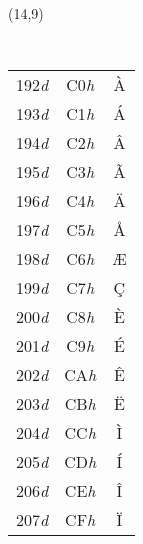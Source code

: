 \documentclass[a4paper, landscape, 10pt]{article} %
\begin{document}
\begin{textblock}{3}(14,9)
{\tt 
  \begin{tabular*}{\textwidth}{|ccc}
    \hline
    192\textit{d} & C0\textit{h} & \`{A} \\
    193\textit{d} & C1\textit{h} & \'{A} \\
    194\textit{d} & C2\textit{h} & \^{A} \\
    195\textit{d} & C3\textit{h} & \~{A} \\
    196\textit{d} & C4\textit{h} & \"{A} \\
    197\textit{d} & C5\textit{h} & \AA \\
    198\textit{d} & C6\textit{h} & \AE \\
    199\textit{d} & C7\textit{h} & \c{C} \\
    200\textit{d} & C8\textit{h} & \`{E} \\
    201\textit{d} & C9\textit{h} & \'{E} \\
    202\textit{d} & CA\textit{h} & \^{E} \\
    203\textit{d} & CB\textit{h} & \"{E} \\
    204\textit{d} & CC\textit{h} & \`{I} \\
    205\textit{d} & CD\textit{h} & \'{I} \\
    206\textit{d} & CE\textit{h} & \^{I} \\
    207\textit{d} & CF\textit{h} & \"{I} \\
    \hline
  \end{tabular*}
}
\end{textblock}
\end{document}
